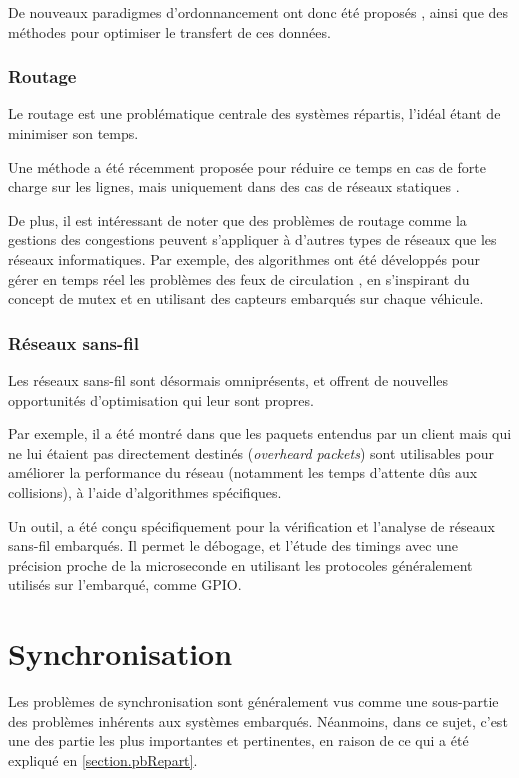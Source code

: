 De nouveaux paradigmes d'ordonnancement ont donc été proposés \cite{yildirim2012data, kosar2009paradigm}, ainsi que des méthodes pour optimiser le transfert de ces données.

\subsubsection{Routage}
Le routage est une problématique centrale des systèmes répartis, l'idéal étant de minimiser son temps.

Une méthode a été récemment proposée pour réduire ce temps en cas de forte charge sur les lignes, mais uniquement dans des cas de réseaux statiques \cite{jeon2014fully}.


De plus, il est intéressant de noter que des problèmes de routage comme la gestions des congestions peuvent s'appliquer à d'autres types de réseaux que les réseaux informatiques. Par exemple, des algorithmes ont été développés pour gérer en temps réel les problèmes des feux de circulation \cite{aoxue2014distributed}, en s'inspirant du concept de \gls{mutex} et en utilisant des capteurs embarqués sur chaque véhicule.

\subsubsection{Réseaux sans-fil}
Les réseaux sans-fil sont désormais omniprésents, et offrent de nouvelles opportunités d'optimisation qui leur sont propres.

Par exemple, il a été montré dans \cite{hosseinabadi2014exploiting} que les paquets entendus par un client mais qui ne lui étaient pas directement destinés (\textit{overheard packets}) sont utilisables pour améliorer la performance du réseau (notamment les temps d'attente dûs aux collisions), à l'aide d'algorithmes spécifiques.

Un outil,  \cite{lim2013flocklab} a été conçu spécifiquement pour la vérification et l'analyse de réseaux sans-fil embarqués. Il permet le débogage, et l'étude des timings avec une précision proche de la microseconde en utilisant les protocoles généralement utilisés sur l'embarqué, comme \ac{GPIO}.  

\section{Synchronisation}
Les problèmes de synchronisation sont généralement vus comme une sous-partie des problèmes inhérents aux systèmes embarqués. Néanmoins, dans ce sujet, c'est une des partie les plus importantes et pertinentes, en raison de ce qui a été expliqué en \cref{section.pbRepart}.


